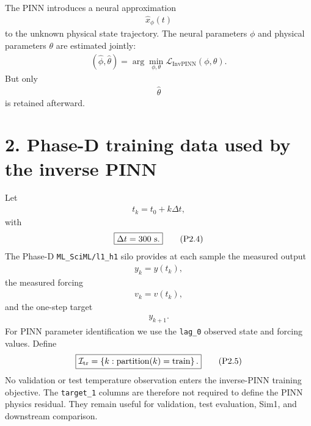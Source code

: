 \documentclass[11pt]{article}
\begin{document}
The PINN introduces a neural approximation
\begin{align}
\boxed{\widehat x_\phi(t)}
\tag{P2.2}
\end{align}
to the unknown physical state trajectory. The neural parameters \(\phi\) and physical parameters \(\theta\) are estimated jointly:
\begin{align}
\boxed{(\widehat\phi,\widehat\theta)=\arg\min_{\phi,\theta}\mathcal L_{\mathrm{InvPINN}}(\phi,\theta).}
\tag{P2.3}
\end{align}
But only
\begin{align}
\boxed{\widehat\theta}
\end{align}
is retained afterward.

\section*{2. Phase-D training data used by the inverse PINN}
Let
\begin{align}
t_k=t_0+k\Delta t,
\end{align}
with
\begin{align}
\boxed{\Delta t=300\ {\rm s}.}
\tag{P2.4}
\end{align}
The Phase-D \texttt{ML\_SciML/l1\_h1} silo provides at each sample the measured output
\begin{align}
y_k=y(t_k),
\end{align}
the measured forcing
\begin{align}
v_k=v(t_k),
\end{align}
and the one-step target
\begin{align}
y_{k+1}.
\end{align}
For PINN parameter identification we use the \texttt{lag\_0} observed state and forcing values. Define
\begin{align}
\boxed{\mathcal I_{\rm tr}=\left\{k:\operatorname{partition}(k)=\text{train}\right\}.}
\tag{P2.5}
\end{align}
No validation or test temperature observation enters the inverse-PINN training objective. The \texttt{target\_1} columns are therefore not required to define the PINN physics residual. They remain useful for validation, test evaluation, Sim1, and downstream comparison.
\end{document}
